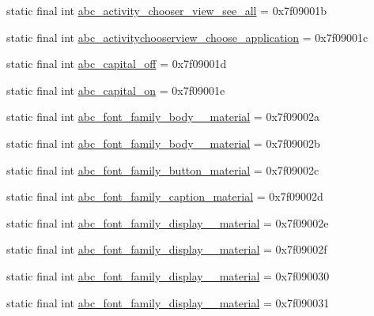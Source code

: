 \begin{CompactItemize}
static final int \hyperlink{classandroid_1_1support_1_1graphics_1_1drawable_1_1_r_1_1string_efee815ff427753f6acab3b5edd6a1a0}{abc\_\-activity\_\-chooser\_\-view\_\-see\_\-all} = 0x7f09001b
\item 
static final int \hyperlink{classandroid_1_1support_1_1graphics_1_1drawable_1_1_r_1_1string_c203a7474a609fef2e7cabf8e4c48929}{abc\_\-activitychooserview\_\-choose\_\-application} = 0x7f09001c
\item 
static final int \hyperlink{classandroid_1_1support_1_1graphics_1_1drawable_1_1_r_1_1string_42e53b9419e14c5e4961788c91a82a43}{abc\_\-capital\_\-off} = 0x7f09001d
\item 
static final int \hyperlink{classandroid_1_1support_1_1graphics_1_1drawable_1_1_r_1_1string_f300df543f85f9e710f6f4baedd7e631}{abc\_\-capital\_\-on} = 0x7f09001e
\item 
static final int \hyperlink{classandroid_1_1support_1_1graphics_1_1drawable_1_1_r_1_1string_c4c946a1435a2bb716045f52366a0fb0}{abc\_\-font\_\-family\_\-body\_\_\-material} = 0x7f09002a
\item 
static final int \hyperlink{classandroid_1_1support_1_1graphics_1_1drawable_1_1_r_1_1string_8dfd43a86ed1c3d2c42f4c07ee690373}{abc\_\-font\_\-family\_\-body\_\_\-material} = 0x7f09002b
\item 
static final int \hyperlink{classandroid_1_1support_1_1graphics_1_1drawable_1_1_r_1_1string_e70fa011a3bea3c4821a47c56792708a}{abc\_\-font\_\-family\_\-button\_\-material} = 0x7f09002c
\item 
static final int \hyperlink{classandroid_1_1support_1_1graphics_1_1drawable_1_1_r_1_1string_d81adebd007e07c5ad702ef907c5bb1f}{abc\_\-font\_\-family\_\-caption\_\-material} = 0x7f09002d
\item 
static final int \hyperlink{classandroid_1_1support_1_1graphics_1_1drawable_1_1_r_1_1string_04b93fb412c2ca7dd6ac43f7911a10b1}{abc\_\-font\_\-family\_\-display\_\_\-material} = 0x7f09002e
\item 
static final int \hyperlink{classandroid_1_1support_1_1graphics_1_1drawable_1_1_r_1_1string_e96f9e6ca5baa8fa1174028f261f32ac}{abc\_\-font\_\-family\_\-display\_\_\-material} = 0x7f09002f
\item 
static final int \hyperlink{classandroid_1_1support_1_1graphics_1_1drawable_1_1_r_1_1string_d3a2af59a76fea748584a6d1d98daea9}{abc\_\-font\_\-family\_\-display\_\_\-material} = 0x7f090030
\item 
static final int \hyperlink{classandroid_1_1support_1_1graphics_1_1drawable_1_1_r_1_1string_0a1cd7db9e04e3547265f23059115292}{abc\_\-font\_\-family\_\-display\_\_\-material} = 0x7f090031

\end{CompactItemize}
